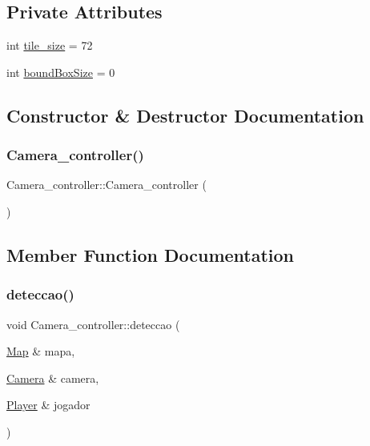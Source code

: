 \subsection*{Private Attributes}
\begin{DoxyCompactItemize}
\item 
int \hyperlink{classCamera__controller_ae2f8c96d3f03011a11cdcb4c8016fcef}{tile\+\_\+size} = 72
\item 
int \hyperlink{classCamera__controller_a3932aa7665e9edc834373a3e2f42f0e1}{bound\+Box\+Size} = 0
\end{DoxyCompactItemize}


\subsection{Constructor \& Destructor Documentation}
\mbox{\label{classCamera__controller_aa086aceef7d7548429d2023f333e3b19}} 
\subsubsection{\texorpdfstring{Camera\+\_\+controller()}{Camera\_controller()}}
{\footnotesize\ttfamily Camera\+\_\+controller\+::\+Camera\+\_\+controller (\begin{DoxyParamCaption}{ }\end{DoxyParamCaption})\hspace{0.3cm}{\ttfamily [default]}}



\subsection{Member Function Documentation}
\mbox{\label{classCamera__controller_a039d613f59cd15c4ea2a0493ca47701b}} 
\subsubsection{\texorpdfstring{deteccao()}{deteccao()}}
{\footnotesize\ttfamily void Camera\+\_\+controller\+::deteccao (\begin{DoxyParamCaption}\item[{\hyperlink{classMap}{Map} \&}]{mapa,  }\item[{\hyperlink{classCamera}{Camera} \&}]{camera,  }\item[{\hyperlink{classPlayer}{Player} \&}]{jogador }\end{DoxyParamCaption})}

